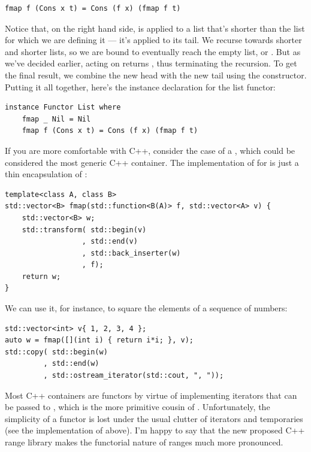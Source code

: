 \begin{Verbatim}[commandchars=\\\{\}]
fmap f (Cons x t) = Cons (f x) (fmap f t)
\end{Verbatim}
Notice that, on the right hand side,  is applied to a
list that's shorter than the list for which we are defining it --- it's
applied to its tail. We recurse towards shorter and shorter lists, so we
are bound to eventually reach the empty list, or . But as
we've decided earlier,  acting on  returns
, thus terminating the recursion. To get the final result,
we combine the new head  with the new tail
 using the  constructor. Putting it
all together, here's the instance declaration for the list functor:

\begin{Verbatim}[commandchars=\\\{\}]
instance Functor List where
    fmap _ Nil = Nil
    fmap f (Cons x t) = Cons (f x) (fmap f t)
\end{Verbatim}
If you are more comfortable with C++, consider the case of a
, which could be considered the most generic C++
container. The implementation of  for 
is just a thin encapsulation of :

\begin{Verbatim}
template<class A, class B>
std::vector<B> fmap(std::function<B(A)> f, std::vector<A> v) {
    std::vector<B> w;
    std::transform( std::begin(v)
                  , std::end(v)
                  , std::back_inserter(w)
                  , f); 
    return w;
}
\end{Verbatim}
We can use it, for instance, to square the elements of a sequence of
numbers:

\begin{Verbatim}
std::vector<int> v{ 1, 2, 3, 4 };
auto w = fmap([](int i) { return i*i; }, v);
std::copy( std::begin(w)
         , std::end(w)
         , std::ostream_iterator(std::cout, ", "));
\end{Verbatim}
Most C++ containers are functors by virtue of implementing iterators
that can be passed to , which is the more
primitive cousin of . Unfortunately, the simplicity of a
functor is lost under the usual clutter of iterators and temporaries
(see the implementation of  above). I'm happy to say that
the new proposed C++ range library makes the functorial nature of ranges
much more pronounced.

